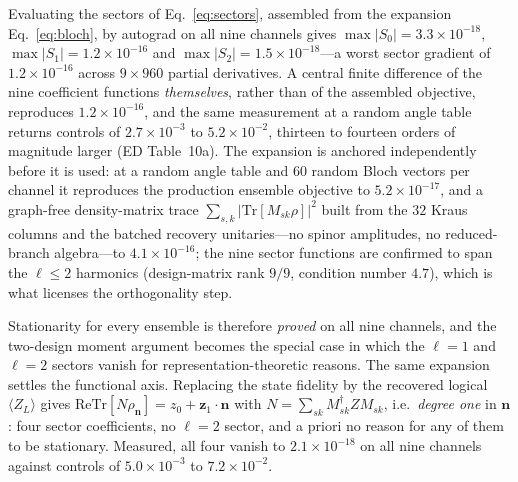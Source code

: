 \documentclass[aps,prxquantum,reprint,superscriptaddress]{revtex4-2}
\newcommand{\tr}{\mathrm{Tr}}
\newcommand{\re}{\mathrm{Re}}
\begin{document}
Evaluating the sectors of Eq.~\eqref{eq:sectors}, assembled from the expansion
Eq.~\eqref{eq:bloch}, by autograd on all nine channels gives
$\max|S_0|=3.3\times10^{-18}$, $\max|S_1|=1.2\times10^{-16}$ and
$\max|S_2|=1.5\times10^{-18}$---a worst sector gradient of $1.2\times10^{-16}$
across $9\times960$ partial derivatives. A central finite difference of the nine
coefficient functions \emph{themselves}, rather than of the assembled objective,
reproduces $1.2\times10^{-16}$, and the same measurement at a random angle table
returns controls of $2.7\times10^{-3}$ to $5.2\times10^{-2}$, thirteen to fourteen
orders of magnitude larger (ED Table~10a). The expansion is anchored independently
before it is
used: at a random angle table and $60$ random Bloch vectors per channel it
reproduces the production ensemble objective to $5.2\times10^{-17}$, and a
graph-free density-matrix trace $\sum_{s,k}|\tr[M_{sk}\rho]|^2$ built from the $32$
Kraus columns and the batched recovery unitaries---no spinor amplitudes, no
reduced-branch algebra---to $4.1\times10^{-16}$; the nine sector functions are
confirmed to span the $\ell\le2$ harmonics (design-matrix rank $9/9$, condition
number $4.7$), which is what licenses the orthogonality step.

Stationarity for every ensemble is therefore \emph{proved} on all nine channels,
and the two-design moment argument becomes the special case in which the $\ell=1$
and $\ell=2$ sectors vanish for representation-theoretic reasons. The same
expansion settles the functional axis. Replacing the state fidelity by the
recovered logical $\langle Z_L\rangle$ gives
$\re\tr[N\rho_{\mathbf n}]=z_0+\mathbf z_1\!\cdot\!\mathbf n$ with
$N=\sum_{sk}M_{sk}^\dagger ZM_{sk}$, i.e.\ \emph{degree one} in $\mathbf n$: four
sector coefficients, no $\ell=2$ sector, and a priori no reason for any of them to
be stationary. Measured, all four vanish to $2.1\times10^{-18}$ on all nine
channels against controls of $5.0\times10^{-3}$ to $7.2\times10^{-2}$.
\end{document}
